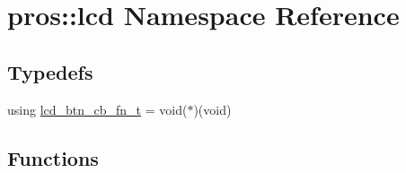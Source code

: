 \hypertarget{namespacepros_1_1lcd}{}\section{pros\+:\+:lcd Namespace Reference}
\label{namespacepros_1_1lcd}
\subsection*{Typedefs}
\begin{DoxyCompactItemize}
\item 
using \hyperlink{namespacepros_1_1lcd_ab5c0cdcf37795ff2a9dcaf546b087dd4}{lcd\+\_\+btn\+\_\+cb\+\_\+fn\+\_\+t} = void($\ast$)(void)
\end{DoxyCompactItemize}
\subsection*{Functions}

